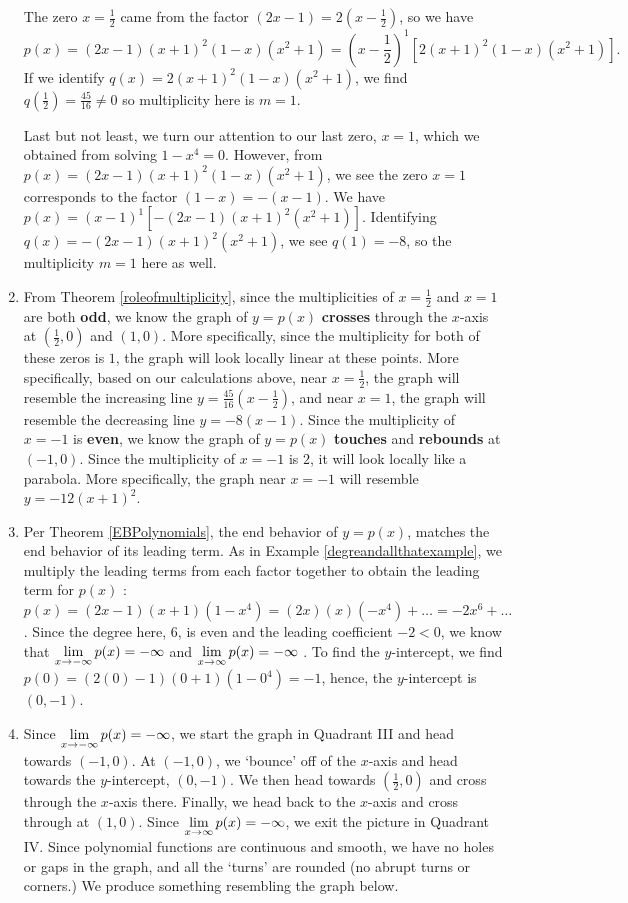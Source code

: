 \documentclass{ximera}
\begin{document}
\begin{ex}
\begin{enumerate}
The zero $x = \frac{1}{2}$ came from the factor $(2x-1) = 2 (x-\frac{1}{2})$, so we have \[ p(x) =  (2x-1)(x+1)^2(1-x)(x^2+1)  = (x -\frac{1}{2})^{1} \left[2 (x+1)^2(1-x)(x^2+1) \right]. \] If we identify $q(x) = 2 (x+1)^2(1-x)(x^2+1)$, we find $q(\frac{1}{2}) = \frac{45}{16} \neq 0$ so multiplicity here is $m=1$.  

Last but not least, we turn our attention to our last zero, $x = 1$, which we obtained from solving $1-x^4=0$.  However, from $p(x) =  (2x-1)(x+1)^2(1-x)(x^2+1)$, we see the zero $x=1$ corresponds to the factor $(1-x) = -(x-1)$.  We have $p(x) = (x-1)^{1}\left[- (2x-1)(x+1)^2(x^2+1)\right]$.  Identifying $q(x) = - (2x-1)(x+1)^2(x^2+1)$, we see $q(1) = -8$, so the multiplicity $m = 1$ here as well.  


\item  From Theorem \ref{roleofmultiplicity}, since the multiplicities of $x = \frac{1}{2}$ and $x = 1$ are both \textbf{odd}, we know the graph of $y = p(x)$ \textbf{crosses} through the $x$-axis at $(\frac{1}{2}, 0)$ and $(1,0)$. More specifically, since the multiplicity for both of these zeros is $1$,  the graph will look locally linear at these points. More specifically, based on our calculations above, near $x = \frac{1}{2}$, the graph will resemble the increasing line $y =  \frac{45}{16} (x - \frac{1}{2})$, and near  $x = 1$, the graph will resemble the decreasing line $y = -8(x-1)$.    Since the multiplicity of $x = -1$ is \textbf{even}, we know the graph of $y = p(x)$ \textbf{touches} and  \textbf{rebounds} at $(-1,0)$.   Since the multiplicity of $x=-1$ is $2$, it will look locally like a parabola.   More specifically, the graph near $x = -1$ will resemble $y = -12(x+1)^2$.

\item  Per Theorem \ref{EBPolynomials}, the end behavior of $y =p(x)$, matches the end behavior of its leading term.  As in Example \ref{degreandallthatexample}, we multiply the leading terms from each factor together to obtain the leading term for $p(x)$ :   $p(x) = (2x-1)(x+1)(1-x^4) = (2x)(x)(-x^4) + \ldots = -2x^6 + \ldots$.  Since the degree here, $6$, is even and the leading coefficient $-2 <0$, we know that $\ds{\lim_{x \rightarrow - \infty} p(x) =  -\infty}$ and $\ds{\lim_{x \rightarrow  \infty} p(x) =  -\infty}$ .  To find the $y$-intercept, we find $p(0) = (2(0)-1)(0+1)(1-0^4) = -1$, hence, the $y$-intercept is $(0,-1)$.  

\item  Since  $\ds{\lim_{x \rightarrow - \infty} p(x) =  -\infty}$,  we start the graph in Quadrant III and head towards $(-1,0)$. At $(-1,0)$, we `bounce' off of the $x$-axis and head towards the $y$-intercept, $(0,-1)$.  We then head towards $\left(\frac{1}{2}, 0 \right)$ and cross through the $x$-axis there.  Finally, we head back to the $x$-axis and cross through at $(1,0)$.  Since $\ds{\lim_{x \rightarrow  \infty} p(x) =  -\infty}$,  we exit the picture in Quadrant IV.  Since polynomial functions are continuous and smooth, we have no holes or gaps in the graph, and all the `turns' are rounded (no abrupt turns or corners.)  We produce something resembling the graph below.


\end{enumerate}
\end{ex}
\end{document}
